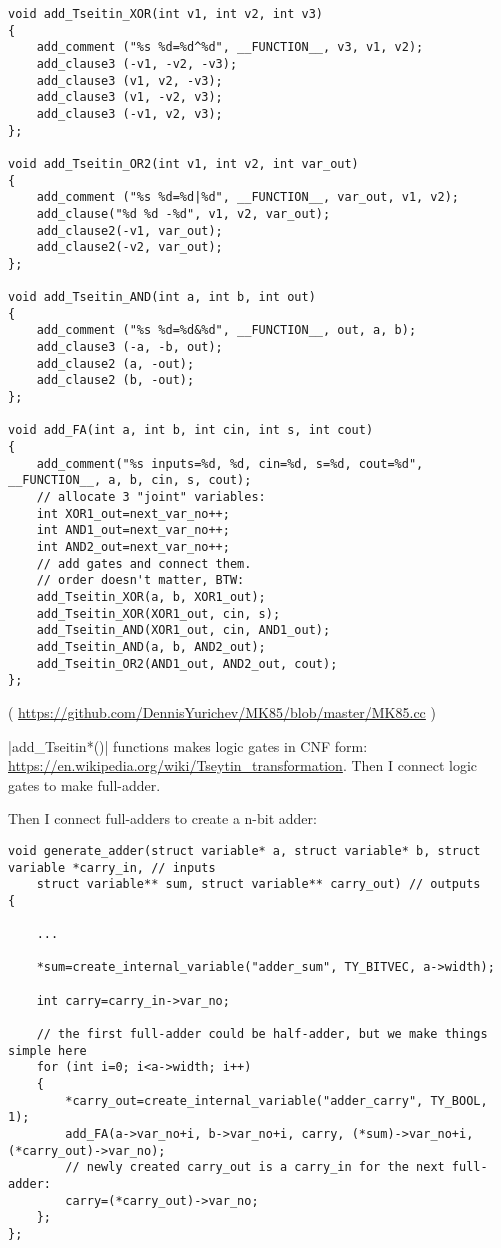 \begin{lstlisting}
void add_Tseitin_XOR(int v1, int v2, int v3)
{
	add_comment ("%s %d=%d^%d", __FUNCTION__, v3, v1, v2);
	add_clause3 (-v1, -v2, -v3);
	add_clause3 (v1, v2, -v3);
	add_clause3 (v1, -v2, v3);
	add_clause3 (-v1, v2, v3);
};

void add_Tseitin_OR2(int v1, int v2, int var_out)
{
	add_comment ("%s %d=%d|%d", __FUNCTION__, var_out, v1, v2);
	add_clause("%d %d -%d", v1, v2, var_out);
	add_clause2(-v1, var_out);
	add_clause2(-v2, var_out);
};

void add_Tseitin_AND(int a, int b, int out)
{
	add_comment ("%s %d=%d&%d", __FUNCTION__, out, a, b);
	add_clause3 (-a, -b, out);
	add_clause2 (a, -out);
	add_clause2 (b, -out);
};

void add_FA(int a, int b, int cin, int s, int cout)
{
	add_comment("%s inputs=%d, %d, cin=%d, s=%d, cout=%d", __FUNCTION__, a, b, cin, s, cout);
	// allocate 3 "joint" variables:
	int XOR1_out=next_var_no++;
	int AND1_out=next_var_no++;
	int AND2_out=next_var_no++;
	// add gates and connect them.
	// order doesn't matter, BTW:
	add_Tseitin_XOR(a, b, XOR1_out);
	add_Tseitin_XOR(XOR1_out, cin, s);
	add_Tseitin_AND(XOR1_out, cin, AND1_out);
	add_Tseitin_AND(a, b, AND2_out);
	add_Tseitin_OR2(AND1_out, AND2_out, cout);
};
\end{lstlisting}

( \url{https://github.com/DennisYurichev/MK85/blob/master/MK85.cc} )

|add\_Tseitin*()| functions makes logic gates in CNF form: \url{https://en.wikipedia.org/wiki/Tseytin_transformation}.
Then I connect logic gates to make full-adder.

Then I connect full-adders to create a n-bit adder:

\begin{lstlisting}
void generate_adder(struct variable* a, struct variable* b, struct variable *carry_in, // inputs
	struct variable** sum, struct variable** carry_out) // outputs
{

	...

	*sum=create_internal_variable("adder_sum", TY_BITVEC, a->width);

	int carry=carry_in->var_no;

	// the first full-adder could be half-adder, but we make things simple here
	for (int i=0; i<a->width; i++)
	{
		*carry_out=create_internal_variable("adder_carry", TY_BOOL, 1);
		add_FA(a->var_no+i, b->var_no+i, carry, (*sum)->var_no+i, (*carry_out)->var_no);
		// newly created carry_out is a carry_in for the next full-adder:
		carry=(*carry_out)->var_no;
	};
};
\end{lstlisting}

